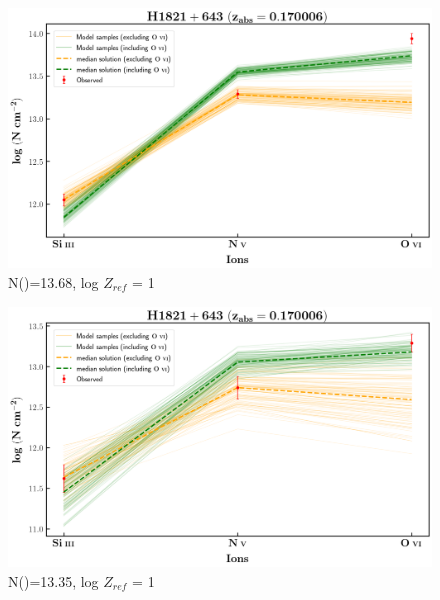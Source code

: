 \documentclass[12pt]{report}
\newcommand\ion[2]{\text{#1\,\textsc{\lowercase{#2}}}}
\begin{document}
\newpage

\begin{figure}[!h]
    \centering
    \includegraphics[width=0.85\linewidth]{Ionisation-Modelling-Plots/h1821-z=0.170006-compII.png}
    \caption{N(\ion{H}{i})=13.68, log $Z_{ref}$ = 1}
\end{figure}

\begin{figure}[!b]
    \centering
    \includegraphics[width=0.85\linewidth]{Ionisation-Modelling-Plots/h1821-z=0.170006-compIII.png}
    \caption{N(\ion{H}{i})=13.35, log $Z_{ref}$ = 1}
\end{figure}



\newpage
\end{document}
